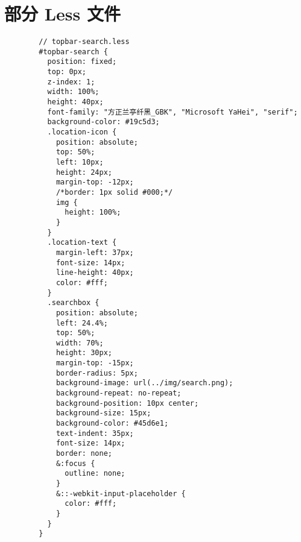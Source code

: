   \section{部分 Less 文件}
    \label{sec:部分_less_文件}
      \begin{lstlisting}
        // topbar-search.less
        #topbar-search {
          position: fixed;
          top: 0px;
          z-index: 1;
          width: 100%;
          height: 40px;
          font-family: "方正兰亭纤黑_GBK", "Microsoft YaHei", "serif";
          background-color: #19c5d3;
          .location-icon {
            position: absolute;
            top: 50%;
            left: 10px;
            height: 24px;
            margin-top: -12px;
            /*border: 1px solid #000;*/
            img {
              height: 100%;
            }
          }
          .location-text {
            margin-left: 37px;
            font-size: 14px;
            line-height: 40px;
            color: #fff;
          }
          .searchbox {
            position: absolute;
            left: 24.4%;
            top: 50%;
            width: 70%;
            height: 30px;
            margin-top: -15px;
            border-radius: 5px;
            background-image: url(../img/search.png);
            background-repeat: no-repeat;
            background-position: 10px center;
            background-size: 15px;
            background-color: #45d6e1;
            text-indent: 35px;
            font-size: 14px;
            border: none;
            &:focus {
              outline: none;
            }
            &::-webkit-input-placeholder {
              color: #fff;
            }
          }
        }
      \end{lstlisting}
